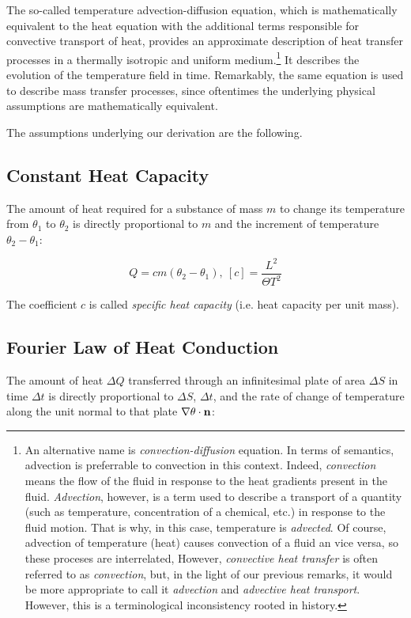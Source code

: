 The so-called temperature advection-diffusion equation, which is mathematically equivalent to the heat equation with the additional terms responsible for convective transport of heat, provides an approximate description of heat transfer processes in a thermally isotropic and uniform medium.\footnote{An alternative name is \emph{convection-diffusion} equation. In terms of semantics, advection is preferrable to convection in this context. Indeed, \emph{convection} means the flow of the fluid in response to the heat gradients present in the fluid. \emph{Advection}, however, is a term used to describe a transport of a quantity (such as temperature, concentration of a chemical, etc.) in response to the fluid motion. That is why, in this case, temperature is \emph{advected}. Of course, advection of temperature (heat) causes convection of a fluid an vice versa, so these proceses are interrelated, However, \emph{convective heat transfer} is often referred to as \emph{convection}, but, in the light of our previous remarks, it would be more appropriate to call it \emph{advection} and \emph{advective heat transport}. However, this is a terminological inconsistency rooted in history.} It describes the evolution of the temperature field in time. Remarkably, the same equation is used to describe mass transfer processes, since oftentimes the underlying physical assumptions are mathematically equivalent.

The assumptions underlying our derivation are the following.\cite{shubin}

\subsection{Constant Heat Capacity}

The amount of heat required for a substance of mass $m$ to change its temperature from $\theta_1$ to $\theta_2$ is directly proportional to $m$ and the increment of temperature $\theta_2 - \theta_1$:

$$ Q = cm(\theta_2 - \theta_1), ~[c] = \frac{L^2}{\Theta T^2} $$

The coefficient $c$ is called \emph{specific heat capacity} (i.e. heat capacity per unit mass).

\subsection{Fourier Law of Heat Conduction}

The amount of heat $\Delta Q$ transferred through an infinitesimal plate of area $\Delta S$ in time $\Delta t$ is directly proportional to $\Delta S$, $\Delta t$, and the rate of change of temperature along the unit normal to that plate $\nabla \theta \cdot \mathbf{n}$:

